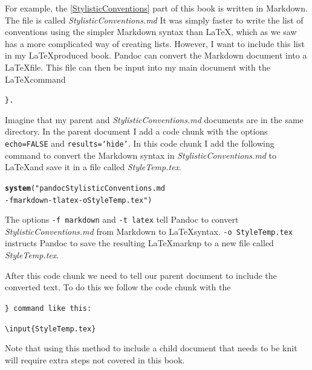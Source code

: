 \documentclass[ChapterTOCs,krantz1]{krantz}\usepackage{graphicx, color}
\makeatletter
\newcommand{\hlfunctioncall}[1]{\textcolor[rgb]{0.501960784313725,0,0.329411764705882}{\textbf{#1}}}%
\newenvironment{kframe}{%
 \def\at@end@of@kframe{}%
 \ifinner\ifhmode%
  \def\at@end@of@kframe{\end{minipage}}%
  \begin{minipage}{\columnwidth}%
 \fi\fi%
 \def\FrameCommand##1{\hskip\@totalleftmargin \hskip-\fboxsep
 \colorbox{shadecolor}{##1}\hskip-\fboxsep
     \hskip-\linewidth \hskip-\@totalleftmargin \hskip\columnwidth}%
 \MakeFramed {\advance\hsize-\width
   \@totalleftmargin\z@ \linewidth\hsize
   \@setminipage}}%
 {\par\unskip\endMakeFramed%
 \at@end@of@kframe}
\newenvironment{knitrout}{}{} %
\makeatother
\begin{document}
For example, the \ref{StylisticConventions} part of this book is written in Markdown. The file is called {\emph{StylisticConventions.md}} It was simply faster to write the list of conventions using the simpler Markdown syntax than \LaTeX, which as we saw has a more complicated way of creating lists. However, I want to include this list in my \LaTeX produced book. Pandoc can convert the Markdown document into a \LaTeX file. This file can then be input into my main document with the \LaTeX command {\tt{\}}.

Imagine that my parent and {\emph{StylisticConventions.md}} documents are in the same directory. In the parent document I add a code chunk with the options {\tt{echo=FALSE}} and {\tt{results=`hide'}}. In this code chunk I add the following command to convert the Markdown syntax in {\emph{StylisticConventions.md}} to \LaTeX and save it in a file called {\emph{StyleTemp.tex}}.

\begin{knitrout}
\color{fgcolor}\begin{kframe}
\begin{alltt}
\hlfunctioncall{system}("pandoc StylisticConventions.md
        -f markdown -t latex -o StyleTemp.tex")
\end{alltt}
\end{kframe}
\end{knitrout}


\noindent The options {\tt{-f markdown}} and {\tt{-t latex}} tell Pandoc to convert {\emph{StylisticConventions.md}} from Markdown to \LaTeX syntax. {\tt{-o StyleTemp.tex}} instructs Pandoc to save the resulting \LaTeX markup to a new file called {\emph{StyleTemp.tex}}. 

After this code chunk we need to tell our parent document to include the converted text. To do this we follow the code chunk with the {\tt{\}} command like this:

\begin{knitrout}
\color{fgcolor}\begin{kframe}
\begin{alltt}
\textbackslash{}input\{StyleTemp.tex\}
\end{alltt}
\end{kframe}
\end{knitrout}


\noindent Note that using this method to include a child document that needs to be knit will require extra steps not covered in this book.
\end{document}
